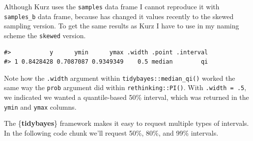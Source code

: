 \documentclass[
  letterpaper,
  DIV=11,
  numbers=noendperiod]{scrreprt}
\newenvironment{Shaded}{\begin{snugshade}}{\end{snugshade}}
\newcommand{\AttributeTok}[1]{\textcolor[rgb]{0.40,0.45,0.13}{#1}}
\newcommand{\CommentTok}[1]{\textcolor[rgb]{0.37,0.37,0.37}{#1}}
\newcommand{\DecValTok}[1]{\textcolor[rgb]{0.68,0.00,0.00}{#1}}
\newcommand{\FunctionTok}[1]{\textcolor[rgb]{0.28,0.35,0.67}{#1}}
\newcommand{\InformationTok}[1]{\textcolor[rgb]{0.37,0.37,0.37}{#1}}
\newcommand{\NormalTok}[1]{\textcolor[rgb]{0.00,0.23,0.31}{#1}}
\newcommand{\SpecialCharTok}[1]{\textcolor[rgb]{0.37,0.37,0.37}{#1}}
\begin{document}
\begin{tcolorbox}[enhanced jigsaw, colframe=quarto-callout-caution-color-frame, colback=white, toprule=.15mm, breakable, arc=.35mm, bottomtitle=1mm, colbacktitle=quarto-callout-caution-color!10!white, toptitle=1mm, titlerule=0mm, title=\textcolor{quarto-callout-caution-color}{\faFire}\hspace{0.5em}{Caution}, leftrule=.75mm, opacityback=0, rightrule=.15mm, opacitybacktitle=0.6, bottomrule=.15mm, left=2mm, coltitle=black]

Although Kurz uses the \texttt{samples} data frame I cannot reproduce it
with \texttt{samples\_b} data frame, because has changed it values
recently to the skewed sampling version. To get the same results as Kurz
I have to use in my naming scheme the \texttt{skewed} version.

\end{tcolorbox}

\begin{Shaded}
\end{Shaded}

\begin{verbatim}
#>           y      ymin      ymax .width .point .interval
#> 1 0.8428428 0.7087087 0.9349349    0.5 median        qi
\end{verbatim}

Note how the \texttt{.width} argument within
\texttt{tidybayes::median\_qi()} worked the same way the \texttt{prob}
argument did within \texttt{rethinking::PI()}. With
\texttt{.width\ =\ .5}, we indicated we wanted a quantile-based 50\%
interval, which was returned in the \texttt{ymin} and \texttt{ymax}
columns.

The \{\textbf{tidybayes}\} framework makes it easy to request multiple
types of intervals. In the following code chunk we'll request 50\%,
80\%, and 99\% intervals.

\begin{Shaded}
\end{Shaded}
\end{document}
